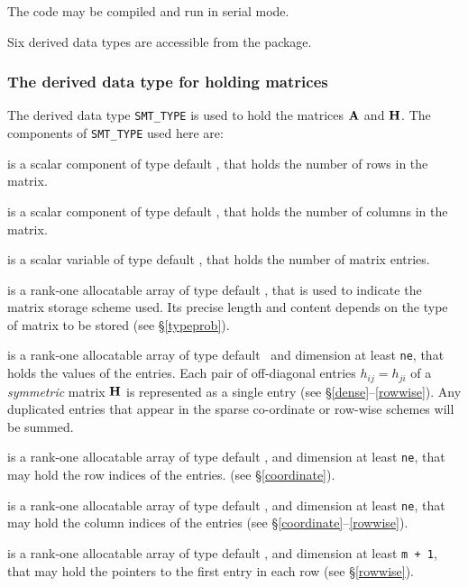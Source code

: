 \documentclass{galahad}
\begin{document}
\noindent
The code may be compiled and run in serial mode.


\galtypes
Six derived data types are accessible from the package.


\subsubsection{The derived data type for holding matrices}\label{typesmt}
The derived data type {\tt SMT\_TYPE} is used to hold the matrices ${\mathbf{A}}$
and ${\mathbf{H}}$. The components of {\tt SMT\_TYPE} used here are:

\begin{description}

 is a scalar component of type default \integer, 
that holds the number of rows in the matrix. 
 
 is a scalar component of type default \integer, 
that holds the number of columns in the matrix. 
 
 is a scalar variable of type default \integer, that
holds the number of matrix entries.

 is a rank-one allocatable array of type default \character, that
is used to indicate the matrix storage scheme used. Its precise length and
content depends on the type of matrix to be stored (see \S\ref{typeprob}).

 is a rank-one allocatable array of type default \realdp\, 
and dimension at least {\tt ne}, that holds the values of the entries. 
Each pair of off-diagonal entries $h_{ij} = h_{ji}$ of a {\em symmetric}
matrix ${\mathbf{H}}$ is represented as a single entry 
(see \S\ref{dense}--\ref{rowwise}).
Any duplicated entries that appear in the sparse 
co-ordinate or row-wise schemes will be summed. 

 is a rank-one allocatable array of type default \integer, 
and dimension at least {\tt ne}, that may hold the row indices of the entries. 
(see \S\ref{coordinate}).

 is a rank-one allocatable array of type default \integer, 
and dimension at least {\tt ne}, that may hold the column indices of the entries
(see \S\ref{coordinate}--\ref{rowwise}).

 is a rank-one allocatable array of type default \integer, 
and dimension at least {\tt m + 1}, that may hold the pointers to
the first entry in each row (see \S\ref{rowwise}).

\end{description}
\end{document}
